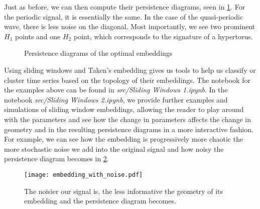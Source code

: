 Just as before, we can then compute their persistence diagrams, seen in \ref{fig:embedding_automatic_diagrams}. For the periodic signal, it is essentially the same. In the case of the quasi-periodic wave, there is less noise on the diagonal. Most importantly, we see two prominent $H_{1}$ points and one $H_{2}$ point, which corresponds to the signature of a hypertorus.

\begin{figure}[h!]
  \centering
  \qquad
  \caption{Persistence diagrams of the optimal embeddings}%
  \label{fig:embedding_automatic_diagrams}%
\end{figure}

Using sliding windows and Taken's embedding gives us tools to help us classify or cluster time series based on the topology of their embeddings. The notebook for the examples above can be found in \textit{src/Sliding Windows 1.ipynb}. In the notebook \textit{src/Sliding Windows 2.ipynb}, we provide further examples and simulations of sliding window embeddings, allowing the reader to play around with the parameters and see how the change in parameters affects the change in geometry and in the resulting persistence diagrams in a more interactive fashion. For example, we can see how the embedding is progressively more chaotic the more stochastic noise we add into the original signal and how noisy the persistence diagram becomes in \ref{fig:embedding_noise}.

\begin{figure}[h!]
  \centering
  \texttt{[image: embedding\_with\_noise.pdf]}
  \caption{The noisier our signal is, the less informative the geometry of its embedding and the persistence diagram becomes.}
  \label{fig:embedding_noise}
\end{figure}
